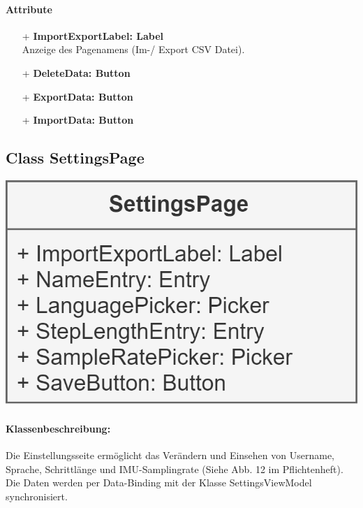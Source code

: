 \documentclass[a4paper,12pt]{article}
\begin{document}
		\paragraph{Attribute}
		\begin{itemize}
			\item[+] \textbf{ImportExportLabel: Label} \\ Anzeige des Pagenamens (Im-/ Export CSV Datei).
			\item [+]\textbf{DeleteData: Button}
			\item [+]\textbf{ExportData: Button}
			\item [+]\textbf{ImportData: Button} %
		\end{itemize}

	\begin{minipage}[b]{0.7\textwidth}

		\subsection{Class SettingsPage}
	\end{minipage}
	\begin{minipage}[c]{0.3\textwidth}
		\includegraphics[width=\textwidth]{bilder/ViewKlassen/SettingsPage.png}
	\end{minipage}
		\paragraph{Klassenbeschreibung:}
		Die Einstellungsseite ermöglicht das Verändern und Einsehen von Username, Sprache, Schrittlänge und IMU-Samplingrate (Siehe Abb. 12 im Pflichtenheft). Die Daten werden per Data-Binding mit der Klasse SettingsViewModel synchronisiert.
\end{document}
